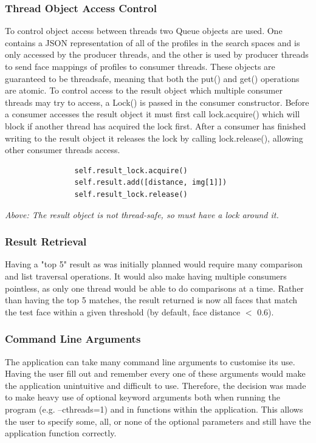 \documentclass[12pt]{article}
\begin{document}
\subsubsection{Thread Object Access Control}
To control object access between threads two Queue objects are used. One contains a JSON representation of all of the profiles in the search spaces and is only accessed by the producer threads, and the other is used by producer threads to send face mappings of profiles to consumer threads. These objects are guaranteed to be threadsafe, meaning that both the put() and get() operations are atomic. To control access to the result object which multiple consumer threads may try to access, a Lock() is passed in the consumer constructor. Before a consumer accesses the result object it must first call lock.acquire() which will block if another thread has acquired the lock first. After a consumer has finished writing to the result object it releases the lock by calling lock.release(), allowing other consumer threads access.

\begin{lstlisting}
				self.result_lock.acquire()
                self.result.add([distance, img[1]])
                self.result_lock.release()
\end{lstlisting}
\textit{Above: The result object is not thread-safe, so must have a lock around it.}

\subsubsection{Result Retrieval}
Having a "top 5" result as was initially planned would require many comparison and list traversal operations. It would also make having multiple consumers pointless, as only one thread would be able to do comparisons at a time. Rather than having the top 5 matches, the result returned is now all faces that match the test face within a given threshold (by default, face distance $<$ 0.6).

\subsubsection{Command Line Arguments}
The application can take many command line arguments to customise its use. Having the user fill out and remember every one of these arguments would make the application unintuitive and difficult to use. Therefore, the decision was made to make heavy use of optional keyword arguments both when running the program (e.g. --cthreads=1) and in functions within the application. This allows the user to specify some, all, or none of the optional parameters and still have the application function correctly. 
\end{document}
